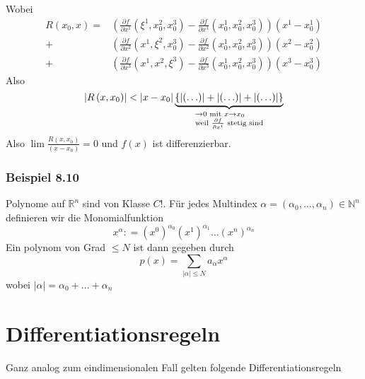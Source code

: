 Wobei 
\begin{align*}
R\left( {{x_0},x} \right) = &\left( {\frac{{\partial f}}{{\partial {x^1}}}\left( {{\xi ^1},x_0^2,x_0^3} \right) - \frac{{\partial f}}{{\partial {x^1}}}\left( {x_0^1,x_0^2,x_0^3} \right)} \right)\left( {{x^1} - x_0^1} \right)\\
 + &\left( {\frac{{\partial f}}{{\partial {x^2}}}\left( {{x^1},{\xi ^2},x_0^3} \right) - \frac{{\partial f}}{{\partial {x^2}}}\left( {x_0^1,x_0^2,x_0^3} \right)} \right)\left( {{x^2} - x_0^2} \right)\\
 + &\left( {\frac{{\partial f}}{{\partial {x^3}}}\left( {{x^1},{x^2},{\xi ^3}} \right) - \frac{{\partial f}}{{\partial {x^3}}}\left( {x_0^1,x_0^2,x_0^3} \right)} \right)\left( {{x^3} - x_0^3} \right)
\end{align*}
Also
\[\left| {R\left( {x,{x_0}} \right)} \right| < \left| {x - {x_0}} \right|\underbrace {\left\{ {\left| {\left(  \ldots  \right)} \right| + \left| {\left(  \ldots  \right)} \right| + \left| {\left(  \ldots  \right)} \right|} \right\}}_{\scriptstyle \to 0{\text{ mit }}x \to {x_0}\hfill\atop
\scriptstyle{\text{weil }}\frac{{\partial f}}{{\partial {x^i}}}{\text{ stetig sind}}\hfill}\]
Also $\lim\frac{R\left( x,x_0\right)}{\left( x-x_0\right)}=0$ und $f(x)$ ist differenzierbar.

\subsubsection*{Beispiel 8.10}
Polynome auf $\mathbb{R}^n$ sind von Klasse $C!$. Für jedes Multindex $\alpha=\left(\alpha_0,\dots , \alpha_n\right)\in\mathbb{N}^n$ definieren wir die Monomialfunktion \[{x^\alpha }: = {\left( {{x^0}} \right)^{{\alpha _0}}}{\left( {{x^1}} \right)^{{\alpha _1}}} \ldots {\left( {{x^n}} \right)^{{\alpha _n}}}\] Ein polynom von Grad $\leq N$ ist dann gegeben durch \[p(x) = \sum\limits_{\left| \alpha  \right| \le N} {{a_\alpha }{x^\alpha }} \] wobei $\left| \alpha  \right| = {\alpha _0} +  \ldots  + {\alpha _n}$
\section{Differentiationsregeln}
Ganz analog zum eindimensionalen Fall gelten folgende Differentiationsregeln

